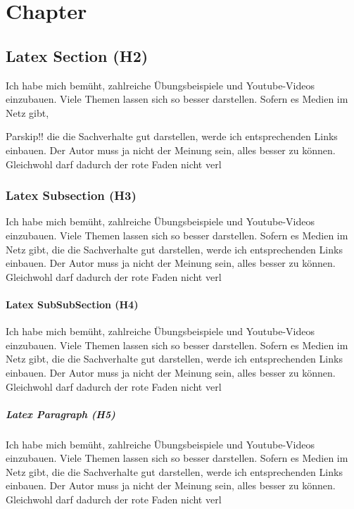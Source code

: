 \documentclass[
  oneside]{book}
\begin{document}
\hypertarget{chapter}{%
\chapter{Chapter}\label{chapter}}

\hypertarget{latex-section-h2}{%
\section{Latex Section (H2)}\label{latex-section-h2}}

Ich habe mich bemüht, zahlreiche Übungsbeispiele und Youtube-Videos einzubauen. Viele Themen lassen sich so besser darstellen. Sofern es Medien im Netz gibt,

Parskip!! die die Sachverhalte gut darstellen, werde ich entsprechenden Links einbauen. Der Autor muss ja nicht der Meinung sein, alles besser zu können. Gleichwohl darf dadurch der rote Faden nicht verl

\hypertarget{latex-subsection-h3}{%
\subsection{Latex Subsection (H3)}\label{latex-subsection-h3}}

Ich habe mich bemüht, zahlreiche Übungsbeispiele und Youtube-Videos einzubauen. Viele Themen lassen sich so besser darstellen. Sofern es Medien im Netz gibt, die die Sachverhalte gut darstellen, werde ich entsprechenden Links einbauen. Der Autor muss ja nicht der Meinung sein, alles besser zu können. Gleichwohl darf dadurch der rote Faden nicht verl

\hypertarget{latex-subsubsection-h4}{%
\subsubsection{Latex SubSubSection (H4)}\label{latex-subsubsection-h4}}

Ich habe mich bemüht, zahlreiche Übungsbeispiele und Youtube-Videos einzubauen. Viele Themen lassen sich so besser darstellen. Sofern es Medien im Netz gibt, die die Sachverhalte gut darstellen, werde ich entsprechenden Links einbauen. Der Autor muss ja nicht der Meinung sein, alles besser zu können. Gleichwohl darf dadurch der rote Faden nicht verl

\hypertarget{latex-paragraph-h5}{%
\paragraph{Latex Paragraph (H5)}\label{latex-paragraph-h5}}

Ich habe mich bemüht, zahlreiche Übungsbeispiele und Youtube-Videos einzubauen. Viele Themen lassen sich so besser darstellen. Sofern es Medien im Netz gibt, die die Sachverhalte gut darstellen, werde ich entsprechenden Links einbauen. Der Autor muss ja nicht der Meinung sein, alles besser zu können. Gleichwohl darf dadurch der rote Faden nicht verl

  
\end{document}
